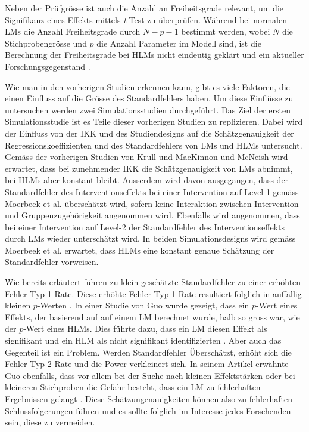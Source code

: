 \documentclass[12pt, a4paper]{article}\usepackage[]{graphicx}\usepackage[]{color}
\begin{document}
Neben der Prüfgrösse ist auch die Anzahl an Freiheitsgrade relevant, um die Signifikanz eines Effekts mittels \textit{t} Test zu überprüfen. Während bei normalen LMs die Anzahl Freiheitsgrade durch $N - p - 1$ bestimmt werden, wobei $N$ die Stichprobengrösse und $p$ die Anzahl Parameter im Modell sind, ist die Berechnung der Freiheitsgrade bei HLMs nicht eindeutig geklärt und ein aktueller Forschungsgegenstand \citep{mcneish2014analyzing,raudenbush2002hierarchical,SnijdersTomA.B2012Ma:a}.

Wie man in den vorherigen Studien erkennen kann, gibt es viele Faktoren, die einen Einfluss auf die Grösse des Standardfehlers haben. Um diese Einflüsse zu untersuchen werden zwei Simulationsstudien durchgeführt. Das Ziel der ersten Simulationsstudie ist es Teile dieser vorherigen Studien zu replizieren. Dabei wird der Einfluss von der IKK und des Studiendesigns auf die Schätzgenauigkeit der Regressionskoeffizienten und des Standardfehlers von LMs und HLMs untersucht. Gemäss der vorherigen Studien von Krull und MacKinnon \citeyearpar{krullmackinnon2010mediation} und McNeish \citeyearpar{mcneish2014analyzing} wird erwartet, dass bei zunehmender IKK die Schätzgenauigkeit von LMs abnimmt, bei HLMs aber konstant bleibt. Ausserdem wird davon ausgegangen, dass der Standardfehler des Interventionseffekts bei einer Intervention auf Level-1 gemäss Moerbeek et al. \citeyearpar{MOERBEEK2003341} überschätzt wird, sofern keine Interaktion zwischen Intervention und Gruppenzugehörigkeit angenommen wird. Ebenfalls wird angenommen, dass bei einer Intervention auf Level-2 der Standardfehler des Interventionseffekts durch LMs wieder unterschätzt wird. In beiden Simulationsdesigns wird gemäss Moerbeek et al. \citeyearpar{MOERBEEK2003341} erwartet, dass HLMs eine konstant genaue Schätzung der Standardfehler vorweisen.

Wie bereits erläutert führen zu klein geschätzte Standardfehler zu einer erhöhten Fehler Typ 1 Rate. Diese erhöhte Fehler Typ 1 Rate resultiert folglich in auffällig kleinen $p$-Werten \citep{raudenbush2002hierarchical, SnijdersTomA.B2012Ma:a}. In einer Studie von Guo \citeyearpar{guo2005groupeddatahlm} wurde gezeigt, dass ein $p$-Wert eines Effekts, der basierend auf auf einem LM berechnet wurde, halb so gross war, wie der $p$-Wert eines HLMs. Dies führte dazu, dass ein LM diesen Effekt als signifikant und ein HLM als nicht signifikant identifizierten \citep{guo2005groupeddatahlm}. Aber auch das Gegenteil ist ein Problem. Werden Standardfehler Überschätzt, erhöht sich die Fehler Typ 2 Rate und die Power verkleinert sich. In seinem Artikel erwähnte Guo ebenfalls, dass vor allem bei der Suche nach kleinen Effektstärken oder bei kleineren Stichproben die Gefahr besteht, dass ein LM zu fehlerhaften Ergebnissen gelangt \citep{guo2005groupeddatahlm}. Diese Schätzungenauigkeiten können also zu fehlerhaften Schlussfolgerungen führen und es sollte folglich im Interesse jedes Forschenden sein, diese zu vermeiden. 
\end{document}
